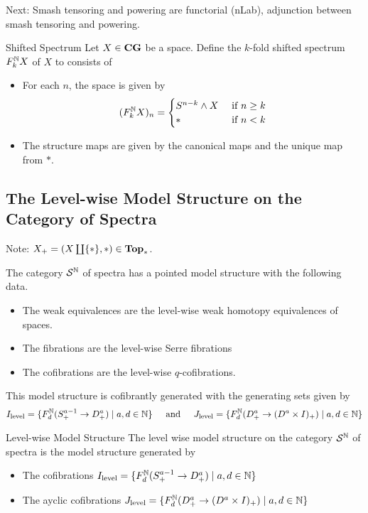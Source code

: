 \documentclass[a4paper]{article}
\begin{document}
Next: Smash tensoring and powering are functorial (nLab), adjunction between smash tensoring and powering. 

\begin{defn}{Shifted Spectrum}{} Let $X\in\bold{CG}$ be a space. Define the $k$-fold shifted spectrum $F_k^{\mathbb{N}} X$ of $X$ to consists of 
\begin{itemize}
\item For each $n$, the space is given by $$(F_k^{\mathbb{N}} X)_n=\begin{cases}
S^{n-k}\wedge X & \text{ if } n\geq k\\
\ast & \text{ if } n<k
\end{cases}$$
\item The structure maps are given by the canonical maps and the unique map from $\ast$. 
\end{itemize}
\end{defn}

\subsection{The Level-wise Model Structure on the Category of Spectra}
Note: $X_+=(X\coprod\{\ast\},\ast)\in\bold{Top}_\ast$. 

\begin{thm}{}{} The category $\mathcal{S}^{\mathbb{N}}$ of spectra has a pointed model structure with the following data. 
\begin{itemize}
\item The weak equivalences are the level-wise weak homotopy equivalences of spaces. 
\item The fibrations are the level-wise Serre fibrations
\item The cofibrations are the level-wise $q$-cofibrations. 
\end{itemize}
This model structure is cofibrantly generated with the generating sets given by $$I_\text{level}=\{F_d^{\mathbb{N}}(S_+^{a-1}\to D_+^a)\;|\;a,d\in\mathbb{N}\}\;\;\;\;\text{ and }\;\;\;\; J_\text{level}=\{F_d^{\mathbb{N}}(D_+^a\to(D^a\times I)_+)\;|\;a,d\in\mathbb{N}\}$$
\end{thm}

\begin{defn}{Level-wise Model Structure}{} The level wise model structure on the category $\mathcal{S}^{\mathbb{N}}$ of spectra is the model structure generated by 
\begin{itemize}
\item The cofibrations $I_\text{level}=\{F_d^{\mathbb{N}}(S_+^{a-1}\to D_+^a)\;|\;a,d\in\mathbb{N}\}$
\item The ayclic cofibrations $J_\text{level}=\{F_d^{\mathbb{N}}(D_+^a\to(D^a\times I)_+)\;|\;a,d\in\mathbb{N}\}$
\end{itemize}
\end{defn}
\end{document}
